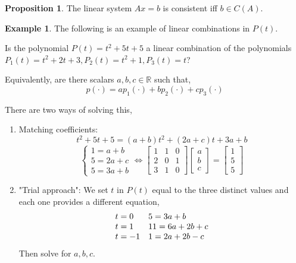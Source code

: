 \documentclass{report}
\theoremstyle{definition}
\newtheorem{_prop}[_thm]{Proposition}
\newtheorem{ex}{Example}[section]
\theoremstyle{remark}
\begin{document}
\begin{_prop}
The linear system $Ax=b$ is consistent iff $b\in C(A)$.
\end{_prop}

\begin{ex}
The following is an example of linear combinations in $P(t)$.

Is the polynomial $P(t)=t^2+5t+5$ a linear combination of the polynomials $P_1(t)=t^2+2t+3, P_2(t)=t^2+1, P_3(t)=t$?

Equivalently, are there scalars $a,b,c\in \mathbb{R}$ such that,
\[p(\cdot)=ap_1(\cdot)+bp_2(\cdot)+cp_3(\cdot)\]

There are two ways of solving this,
\begin{enumerate}
 \item Matching coefficients:
 \[t^2+5t+5=(a+b)t^2+(2a+c)t+3a+b\]
 \[\left\{ 
  \begin{array}{l}
    1 = a+b \\
    5=2a+c \\
    5=3a+b
  \end{array} \right. \Leftrightarrow
  \begin{bmatrix}
  1 & 1 & 0 \\
  2 & 0 & 1 \\
  3 & 1 & 0
  \end{bmatrix}
  \begin{bmatrix}
  a \\ b \\ c
  \end{bmatrix}=
  \begin{bmatrix}
  1 \\ 5 \\ 5
  \end{bmatrix}\]
 \item "Trial approach":
 We set $t$ in $P(t)$ equal to the three distinct values and each one provides a different equation,
 \[\begin{array}{l l}
 t=0 & 5=3a+b \\
 t=1 & 11=6a+2b+c \\
 t=-1 & 1=2a+2b-c
 \end{array}\]
 Then solve for $a, b, c$.
\end{enumerate}
\end{ex}
\end{document}
